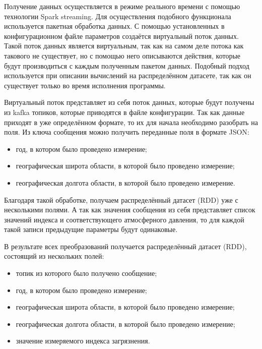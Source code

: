 Получение данных осуществляется в режиме реального времени с помощью технологии Spark streaming.
Для осуществления подобного функционала используется пакетная обработка данных.
С помощью установленных в конфигурационном файле параметров создаётся виртуальный поток данных.
Такой поток данных является виртуальным, так как на самом деле потока как такового не существует, но с помощью него описываются действия, которые будут производиться с каждым полученным пакетом данных.
Подобный подход используется при описании вычислений на распределённом датасете, так как он существует только во время исполнения программы.

Виртуальный поток представляет из себя поток данных, которые будут получены из kafka топиков, которые приводятся в файле конфигурации.
Так как данные приходят в уже определённом формате, то их для начала необходимо разобрать на поля.
Из ключа сообщения можно получить переданные поля в формате JSON:
\begin{itemize}
    \item год, в котором было проведено измерение;
    \item географическая широта области, в которой было проведено измерение;
    \item географическая долгота области, в которой было проведено измерение.
\end{itemize}

Благодаря такой обработке, получаем распределённый датасет (RDD) уже с несколькими полями.
А так как значения сообщения из себя представляет список значений индекса и соответствующего атмосферного давления, то для каждой такой записи предыдущие параметры будут одинаковые.

В результате всех преобразований получается распределённый датасет (RDD), состоящий из нескольких полей:
\begin{itemize}
    \item топик из которого было получено сообщение;
    \item год, в котором было проведено измерение;
    \item географическая широта области, в которой было проведено измерение;
    \item географическая долгота области, в которой было проведено измерение;
    \item значение измеряемого индекса загрязнения.
\end{itemize}

